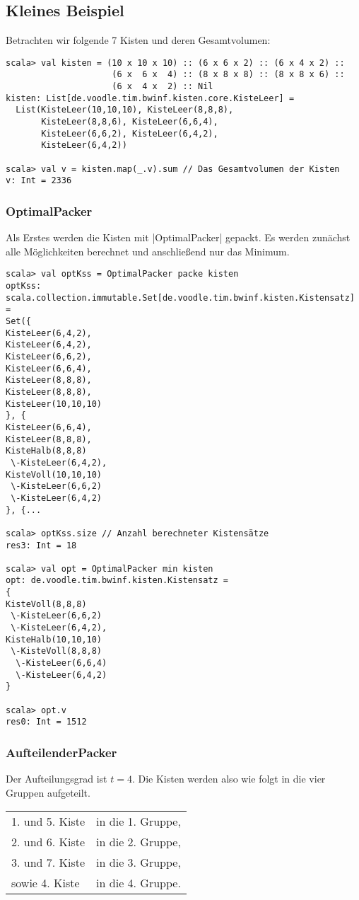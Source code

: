 \subsection{Kleines Beispiel}
Betrachten wir folgende 7 Kisten und deren Gesamtvolumen:
\begin{lstlisting}
scala> val kisten = (10 x 10 x 10) :: (6 x 6 x 2) :: (6 x 4 x 2) ::
                     (6 x  6 x  4) :: (8 x 8 x 8) :: (8 x 8 x 6) ::
                     (6 x  4 x  2) :: Nil
kisten: List[de.voodle.tim.bwinf.kisten.core.KisteLeer] =
  List(KisteLeer(10,10,10), KisteLeer(8,8,8),
       KisteLeer(8,8,6), KisteLeer(6,6,4),
       KisteLeer(6,6,2), KisteLeer(6,4,2),
       KisteLeer(6,4,2))

scala> val v = kisten.map(_.v).sum // Das Gesamtvolumen der Kisten
v: Int = 2336

\end{lstlisting}

\subsubsection*{OptimalPacker}
Als Erstes werden die Kisten mit |OptimalPacker| gepackt.
Es werden zunächst alle Möglichkeiten berechnet und anschließend nur das Minimum.

\begin{lstlisting}
scala> val optKss = OptimalPacker packe kisten
optKss: scala.collection.immutable.Set[de.voodle.tim.bwinf.kisten.Kistensatz] = 
Set({
KisteLeer(6,4,2),
KisteLeer(6,4,2),
KisteLeer(6,6,2),
KisteLeer(6,6,4),
KisteLeer(8,8,8),
KisteLeer(8,8,8),
KisteLeer(10,10,10)
}, {
KisteLeer(6,6,4),
KisteLeer(8,8,8),
KisteHalb(8,8,8)
 \-KisteLeer(6,4,2),
KisteVoll(10,10,10)
 \-KisteLeer(6,6,2)
 \-KisteLeer(6,4,2)
}, {...

scala> optKss.size // Anzahl berechneter Kistensätze
res3: Int = 18

scala> val opt = OptimalPacker min kisten
opt: de.voodle.tim.bwinf.kisten.Kistensatz = 
{
KisteVoll(8,8,8)
 \-KisteLeer(6,6,2)
 \-KisteLeer(6,4,2),
KisteHalb(10,10,10)
 \-KisteVoll(8,8,8)
  \-KisteLeer(6,6,4)
  \-KisteLeer(6,4,2)
}

scala> opt.v
res0: Int = 1512
\end{lstlisting}

\subsubsection*{AufteilenderPacker}
Der Aufteilungsgrad ist $t=4$.
Die Kisten werden also wie folgt in die vier Gruppen aufgeteilt.\\
\begin{tabular}{ll}
 1. und 5. Kiste & in die 1. Gruppe, \\
 2. und 6. Kiste & in die 2. Gruppe, \\
 3. und 7. Kiste & in die 3. Gruppe, \\
  sowie 4. Kiste & in die 4. Gruppe. \\
\end{tabular}

